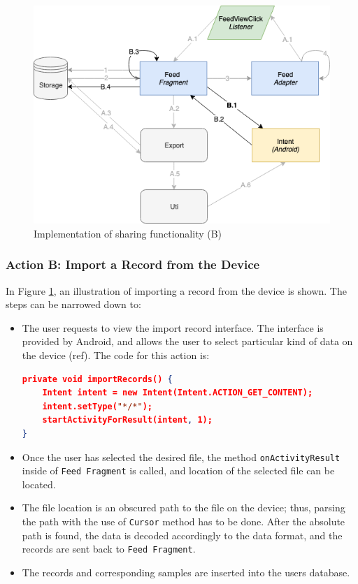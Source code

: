 \begin{figure}
    \centering
    \includegraphics[scale=0.6]{images/Sharing_ImpB.png}
    \caption{Implementation of sharing functionality (B)}
    \label{fig:impl_sharingB}
\end{figure}

\subsubsection{Action B: Import a Record from the Device}
In Figure \ref{fig:impl_sharingB}, an illustration of importing a record from the device is shown. The steps can be narrowed down to:

\begin{itemize}
    \item[B.1] The user requests to view the import record interface. The interface is provided by Android, and allows the user to select particular kind of data on the device (ref). The code for this action is:
\begin{lstlisting}[language=json, caption={My Caption}, captionpos=b]
private void importRecords() {
    Intent intent = new Intent(Intent.ACTION_GET_CONTENT);
    intent.setType("*/*");
    startActivityForResult(intent, 1);
}

\end{lstlisting}
    \item[B.2] Once the user has selected the desired file, the method \verb|onActivityResult| inside of \verb|Feed Fragment| is called, and location of the selected file can be located. 
    \item[B.3] The file location is an obscured path to the file on the device; thus, parsing the path with the use of \verb|Cursor| method has to be done. After the absolute path is found, the data is decoded accordingly to the data format, and the records are sent back to \verb|Feed Fragment|.
    \item[B.4] The records and corresponding samples are inserted into the users database. 
\end{itemize}





